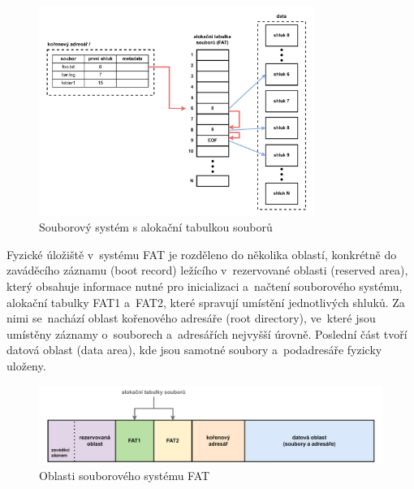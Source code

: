 \begin{figure}[h]
    \centering
    \includegraphics[width=0.80\textwidth]{obrazky-figures/fat_file_system-cz.pdf}
    
    \caption{Souborový systém s alokační tabulkou souborů~\cite{recoverit_fat_filesystem}}
    \label{fig:fat-file-system-structure}
\end{figure}

Fyzické úložiště v~systému FAT je rozděleno do několika oblastí, konkrétně do zaváděcího záznamu (boot record) ležícího v~rezervované oblasti (reserved area), který obsahuje informace nutné pro inicializaci a~načtení souborového systému, alokační tabulky FAT1 a~FAT2, které spravují umístění jednotlivých shluků. Za nimi se~nachází oblast kořenového adresáře (root directory), ve~které jsou umístěny záznamy o~souborech a~adresářích nejvyšší úrovně. Poslední část tvoří datová oblast (data area), kde jsou samotné soubory a~podadresáře fyzicky uloženy.~\cite{recoverit_fat_filesystem}

\newpage

\begin{figure}[h]
    \centering
    \includegraphics[width=1.00\textwidth]{obrazky-figures/fatfs_structure-cz.pdf}
    
    \caption{Oblasti souborového systému FAT~\cite{recoverit_fat_filesystem}}
    \label{fig:fatfs-structure}
\end{figure}

